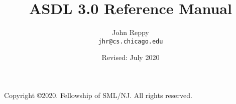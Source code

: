 \documentclass[11pt,letterpaper]{book}
\title{ASDL 3.0 Reference Manual}
\author{
  John Reppy\\
  \texttt{jhr@cs.chicago.edu}}
\date{Revised: July 2020}
\begin{document}
\frontmatter

\maketitle

\phantom{.}

\noindent Copyright \copyright{}2020.  Fellowship of SML/NJ.  All rights reserved.

\vskip 12pt

\pagebreak

\tableofcontents

\mainmatter


\newpage


%
%




%



\backmatter



\end{document}
